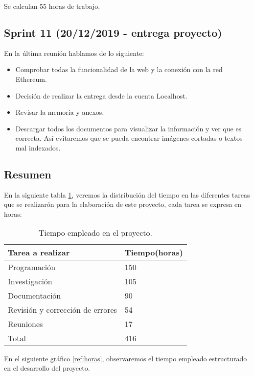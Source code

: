 Se calculan 55 horas de trabajo.

\subsection{Sprint 11 (20/12/2019 - entrega proyecto)}

En la última reunión hablamos de lo siguiente:

\begin{itemize}
	\item Comprobar todas la funcionalidad de la web y la conexión con la red Ethereum.
	\item Decisión de realizar la entrega desde la cuenta Localhost.
	\item Revisar la memoria y anexos.
	\item Descargar todos los documentos para visualizar la información y ver que es correcta. Así evitaremos que se pueda encontrar imágenes cortadas o textos mal indexados.
\end{itemize}


\subsection{Resumen}

En la siguiente tabla \ref{tabla:tabla1}, veremos la distribución del tiempo en las diferentes tareas que se realizarón  para la elaboración de este proyecto, cada tarea se expresa en horas:

\begin{table}[H]
	\begin{center}
		\begin{tabular}{|l|l|}
		\hline
			Tarea a realizar & Tiempo(horas)\\ 
			\hline \hline
			Programación & 150 \\ \hline
			Investigación & 105 \\ \hline
			Documentación & 90 \\ \hline
			Revisión y corrección de errores & 54\\ \hline
			Reuniones & 17 \\ \hline
			Total & 416 \\ \hline
		\end{tabular}
	\caption{Tiempo empleado en el proyecto.}
	\label{tabla:tabla1}
	\end{center}
\end{table}

En el siguiente gráfico \ref{ref:horas}, observaremos el tiempo empleado estructurado en el desarrollo del proyecto.


